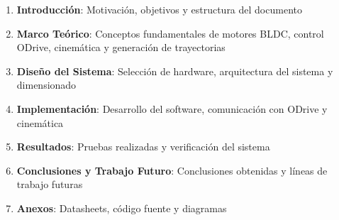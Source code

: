 \begin{enumerate}
    \item \textbf{Introducción}: Motivación, objetivos y estructura del documento
    \item \textbf{Marco Teórico}: Conceptos fundamentales de motores BLDC, control ODrive, cinemática y generación de trayectorias
    \item \textbf{Diseño del Sistema}: Selección de hardware, arquitectura del sistema y dimensionado
    \item \textbf{Implementación}: Desarrollo del software, comunicación con ODrive y cinemática
    \item \textbf{Resultados}: Pruebas realizadas y verificación del sistema
    \item \textbf{Conclusiones y Trabajo Futuro}: Conclusiones obtenidas y líneas de trabajo futuras
    \item \textbf{Anexos}: Datasheets, código fuente y diagramas
\end{enumerate}
